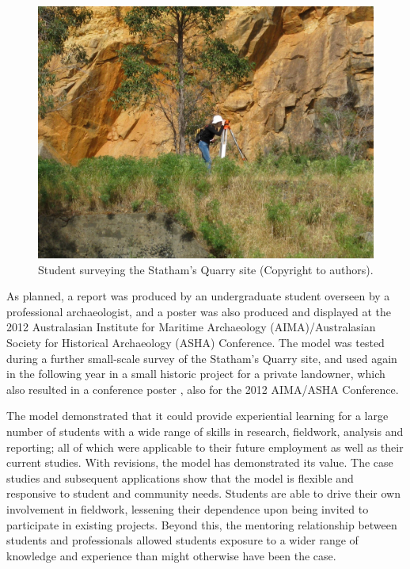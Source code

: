 \documentclass[%
]{ijsra}
\begin{document}
	\begin{figure} %
		\includegraphics[width=\linewidth]{figures/Fyfe-Figure03}
		\caption{Student surveying the Statham's Quarry site (Copyright to authors).}
		\centering
		\label{fig:Fyfe-Figure03}
	\end{figure}
	
	As planned, a report \parencite{murszewskiwinter2012} was produced by an undergraduate student overseen by a professional archaeologist, 
	and a poster \parencite{murszewski2012} was also produced and displayed at the 2012 Australasian Institute for Maritime Archaeology (AIMA)/Australasian Society for Historical Archaeology (ASHA) Conference. 
	The model was tested during a further small-scale survey of the Statham’s Quarry site, and used again in the following year in a small historic project for a private landowner, which also resulted in a conference poster \parencite{busher2012}, also for the 2012 AIMA/ASHA Conference.
	
	The model demonstrated that it could provide experiential learning for a large number of students with a wide range of skills in research, fieldwork, analysis and reporting; all of which were applicable to their future employment as well as their current studies. 
	With revisions, the model has demonstrated its value. The case studies and subsequent applications show that the model is flexible and responsive to student and community needs. 
	Students are able to drive their own involvement in fieldwork, lessening their dependence upon being invited to participate in existing projects. Beyond this, the mentoring relationship between students and professionals allowed students exposure to a wider range of knowledge and experience than might otherwise have been the case.
	
\end{document}
